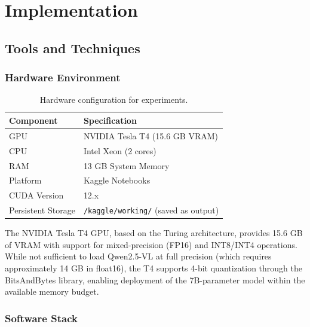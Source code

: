 \chapter{Implementation}

\section{Tools and Techniques}

\subsection{Hardware Environment}

\begin{table}[H]
\centering
\caption{Hardware configuration for experiments.}
\label{tab:hardware_config}
\begin{tabular}{ll}
\toprule
\textbf{Component} & \textbf{Specification} \\
\midrule
GPU & NVIDIA Tesla T4 (15.6 GB VRAM) \\
CPU & Intel Xeon (2 cores) \\
RAM & 13 GB System Memory \\
Platform & Kaggle Notebooks \\
CUDA Version & 12.x \\
Persistent Storage & \texttt{/kaggle/working/} (saved as output) \\
\bottomrule
\end{tabular}
\end{table}

The NVIDIA Tesla T4 GPU, based on the Turing architecture, provides 15.6 GB of VRAM with support for mixed-precision (FP16) and INT8/INT4 operations. While not sufficient to load Qwen2.5-VL at full precision (which requires approximately 14 GB in float16), the T4 supports 4-bit quantization through the BitsAndBytes library, enabling deployment of the 7B-parameter model within the available memory budget.

\subsection{Software Stack}

